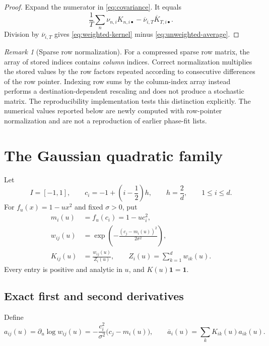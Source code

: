 \documentclass[11pt]{article}
\theoremstyle{definition}
\theoremstyle{remark}
\newtheorem{remark}[theorem]{Remark}
\newcommand{\one}{\mathbf 1}
\begin{document}
\begin{proof}
Expand the numerator in \eqref{eq:covariance}.  It equals
\[
  \frac1T\sum_n\nu_{n,i}K_{n,i\bullet}
  -\overline\nu_{i,T}\overline K_{T,i\bullet}.
\]
Division by $\overline\nu_{i,T}$ gives \eqref{eq:weighted-kernel} minus
\eqref{eq:unweighted-average}.
\end{proof}

\begin{remark}[Sparse row normalization]\label{rem:csr}
For a compressed sparse row matrix, the array of stored indices contains
\emph{column} indices.  Correct normalization multiplies the stored values by
the row factors repeated according to consecutive differences of the row
pointer.  Indexing row sums by the column-index array instead performs a
destination-dependent rescaling and does not produce a stochastic matrix.
The reproducibility implementation tests this distinction explicitly.  The
numerical values reported below are newly computed with row-pointer
normalization and are not a reproduction of earlier phase-fit lists.
\end{remark}

\section{The Gaussian quadratic family}
\label{sec:gaussian}

Let
\[
  I=[-1,1],\qquad
  c_i=-1+\left(i-\frac12\right)h,\qquad
  h=\frac2d,\qquad 1\le i\le d.
\]
For $f_u(x)=1-u x^2$ and fixed $\sigma>0$, put
\begin{align}
  m_i(u)&=f_u(c_i)=1-u c_i^2,\label{eq:mean}\\
  w_{ij}(u)&=\exp\left(
    -\frac{(c_j-m_i(u))^2}{2\sigma^2}
  \right),\label{eq:weight}\\
  K_{ij}(u)&=\frac{w_{ij}(u)}{Z_i(u)},\qquad
  Z_i(u)=\sum_{k=1}^d w_{ik}(u).
  \label{eq:kernel}
\end{align}
Every entry is positive and analytic in $u$, and $K(u)\one=\one$.

\subsection{Exact first and second derivatives}

Define
\begin{equation}\label{eq:score}
  a_{ij}(u)=\partial_u\log w_{ij}(u)
  =-\frac{c_i^2}{\sigma^2}\bigl(c_j-m_i(u)\bigr),
  \qquad
  \overline a_i(u)=\sum_kK_{ik}(u)a_{ik}(u).
\end{equation}
\end{document}
